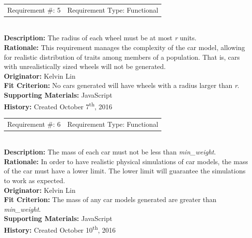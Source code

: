 \documentclass[12pt, titlepage]{article}
\begin{document}
\begin{reqbox}
%
\begin{tabular}{cc}
Requirement \#: 5 & Requirement Type: Functional \\
\end{tabular} \\
%
\textbf{Description:} The radius of each wheel must be at most \textit{r} units. 
\\
\textbf{Rationale:}  This requirement manages the complexity of the car model, 
allowing for realistic distribution of traits among members of a population. 
That is, cars with unrealistically sized wheels will not be generated.\\
\textbf{Originator:} Kelvin Lin\\
\textbf{Fit Criterion:} No cars generated will have wheels with a radius larger 
than \textit{r}.\\
%  
\textbf{Supporting Materials:} JavaScript \\
\textbf{History:} Created October 7\textsuperscript{th}, 2016
%
\end{reqbox}

\begin{reqbox}
%
\begin{tabular}{cc}
Requirement \#: 6 & Requirement Type: Functional \\
\end{tabular} \\
%
\textbf{Description:} The mass of each car must not be less than 
\textit{min\_weight}. \\
\textbf{Rationale:} In order to have realistic physical simulations of car 
models, the mass of the car must have a lower limit. The lower limit will 
guarantee the simulations to work as expected. \\
\textbf{Originator:} Kelvin Lin\\
\textbf{Fit Criterion:} The mass of any car models generated are greater than 
\textit{min\_weight}.\\
%  
\textbf{Supporting Materials:} JavaScript \\
\textbf{History:} Created October 10\textsuperscript{th}, 2016
%
\end{reqbox}
\end{document}
